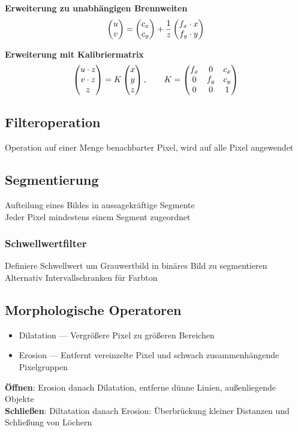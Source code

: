 \textbf{Erweiterung zu unabhängigen Brennweiten}\\
\[\begin{pmatrix}u \\ v\end{pmatrix} = \begin{pmatrix}c_x \\ c_y\end{pmatrix} + \frac{1}{z}\begin{pmatrix}f_x \cdot x \\ f_y \cdot y\end{pmatrix}\]

\textbf{Erweiterung mit Kalibriermatrix}\\
\[\begin{pmatrix}u \cdot z\\ v \cdot z\\ z\end{pmatrix} = K \begin{pmatrix}x \\ y \\ z\end{pmatrix}, \qquad K = \begin{pmatrix}f_x & 0 & c_x\\ 0 & f_y & c_y \\ 0 & 0 & 1\end{pmatrix}\]

\subsection{Filteroperation}
Operation auf einer Menge benachbarter Pixel, wird auf alle Pixel angewendet

\subsection{Segmentierung}
Aufteilung eines Bildes in aussagekräftige Segmente\\
Jeder Pixel mindestens einem Segment zugeordnet

\subsubsection{Schwellwertfilter}
Definiere Schwellwert um Grauwertbild in binäres Bild zu segmentieren\\
Alternativ Intervallschranken für Farbton

\subsection{Morphologische Operatoren}
\begin{itemize}
\item Dilatation --- Vergrößere Pixel zu größeren Bereichen
\item Erosion --- Entfernt vereinzelte Pixel und schwach zusammenhängende Pixelgruppen
\end{itemize}

\textbf{Öffnen}: Erosion danach Dilatation, entferne dünne Linien, außenliegende Objekte\\
\textbf{Schließen}: Diltatation danach Erosion: Überbrückung kleiner Distanzen und Schließung von Löchern\\

